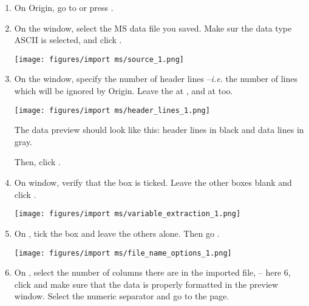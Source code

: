 \documentclass[a4paper, 11pt, raggedright, parskip, sans, colorful]{tufte-style-article}
\begin{document}
\begin{enumerate}

\item On Origin, go to  or press .

\item On the  window, select the MS data file you saved. Make sur the data type ASCII is selected, and click .

\texttt{[image: figures/import ms/source\_1.png]}

\item On the  window, specify the number of header lines --\textit{i.e.} the number of lines which will be ignored by Origin. Leave the  at , and  at  too.

\texttt{[image: figures/import ms/header\_lines\_1.png]}

The data preview should look like this: header lines in  black and data lines in gray.

Then, click .

\item On  window, verify that the  box is ticked. Leave the other boxes blank and click . 

\texttt{[image: figures/import ms/variable\_extraction\_1.png]}

\item On , tick the  box and leave the others alone. Then go .

\texttt{[image: figures/import ms/file\_name\_options\_1.png]}

\item On , select the number of columns there are in the imported file, -- here 6, click  and make sure that the data is properly formatted in the preview window. Select the  numeric separator and go to the  page.


\end{enumerate}
\end{document}

